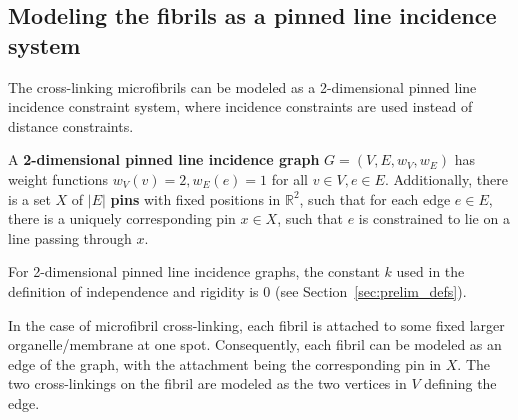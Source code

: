 \subsection{Modeling the fibrils as a pinned line incidence system}



The cross-linking  microfibrils can be modeled as a 2-dimensional pinned line incidence constraint system,
where incidence constraints are used instead of distance constraints.

A \textbf{2-dimensional pinned line incidence graph}  $G=(V,E, w_V, w_E)$ 
 has weight functions $w_V(v) = 2, w_E(e) = 1$ for all $v \in V, e \in E$.
Additionally, there is  a  set $X$ of $|E|$ \textbf{pins} with fixed positions in $\mathbb{R}^2$,
such that  %
for each edge $e \in E$, there is a uniquely corresponding pin $x \in X$,
such that $e$ is constrained to lie on a line passing through $x$.


\begin{remark}
For 2-dimensional pinned line incidence graphs,
the constant $k$ used in the definition of independence and rigidity is $0$  \cite{xxx} (see Section~\ref{sec:prelim_defs}).
\end{remark}



In the case of microfibril cross-linking, each fibril is
attached to some fixed larger organelle/membrane at one spot.
Consequently, each fibril can be modeled as an edge of the graph,
with the attachment being the corresponding pin in $X$.
The two cross-linkings on the fibril are modeled as the two vertices in $V$ defining the edge.



